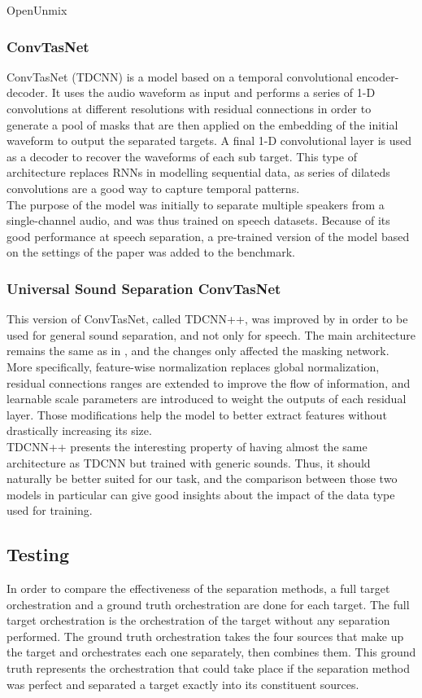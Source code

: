 \documentclass{article}
\begin{document}
			OpenUnmix \cite{open-unmix}
			
			\subsubsection{ConvTasNet}
			ConvTasNet \cite{tdcnn} (TDCNN) is a model based on a temporal convolutional encoder-decoder. It uses the audio waveform as input and performs a series of 1-D convolutions at different resolutions with residual connections in order to generate a pool of masks that are then applied on the embedding of the initial waveform to output the separated targets. A final 1-D convolutional layer is used as a decoder to recover the waveforms of each sub target. This type of architecture replaces RNNs in modelling sequential data, as series of dilateds convolutions are a good way to capture temporal patterns.\\
			
			The purpose of the model was initially to separate multiple speakers from a single-channel audio, and was thus trained on speech datasets. Because of its good performance at speech separation, a pre-trained version of the model based on the settings of the paper was added to the benchmark.
			
			\subsubsection{Universal Sound Separation ConvTasNet}
			This version of ConvTasNet, called TDCNN++, was improved by \cite{tdcnnpp} in order to be used for general sound separation, and not only for speech. The main architecture remains the same as in \cite{tdcnn}, and the changes only affected the masking network. More specifically, feature-wise normalization replaces global normalization, residual connections ranges are extended to improve the flow of information, and learnable scale parameters are introduced to weight the outputs of each residual layer. Those modifications help the model to better extract features without drastically increasing its size.\\
			
			TDCNN++ presents the interesting property of having almost the same architecture as TDCNN but trained with generic sounds. Thus, it should naturally be better suited for our task, and the comparison between those two models in particular can give good insights about the impact of the data type used for training.
	
		\subsection{Testing}
		In order to compare the effectiveness of the separation methods, a full target orchestration and a ground truth orchestration are done for each target. The full target orchestration is the orchestration of the target without any separation performed. The ground truth orchestration takes the four sources that make up the target and orchestrates each one separately, then combines them. This ground truth represents the orchestration that could take place if the separation method was perfect and separated a target exactly into its constituent sources. 
		
\end{document}
